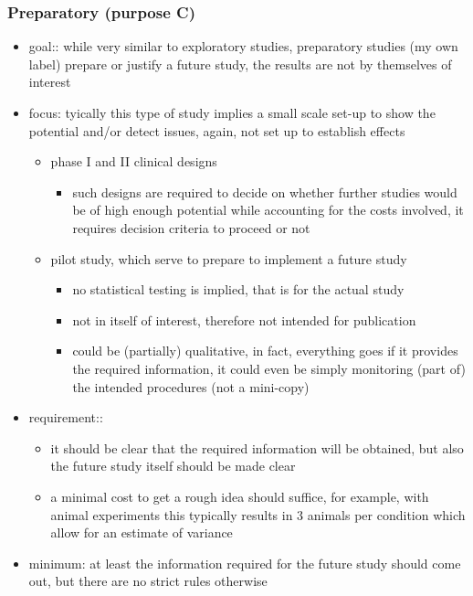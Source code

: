 \documentclass[]{article}
\providecommand{\tightlist}{%
  \setlength{\itemsep}{0pt}\setlength{\parskip}{0pt}}
\begin{document}
\subsubsection{Preparatory (purpose C)}\label{preparatory-purpose-c}

\begin{itemize}
\tightlist
\item
  goal:: while very similar to exploratory studies, preparatory studies
  (my own label) prepare or justify a future study, the results are not
  by themselves of interest
\item
  focus: tyically this type of study implies a small scale set-up to
  show the potential and/or detect issues, again, not set up to
  establish effects

  \begin{itemize}
  \tightlist
  \item
    phase I and II clinical designs

    \begin{itemize}
    \tightlist
    \item
      such designs are required to decide on whether further studies
      would be of high enough potential while accounting for the costs
      involved, it requires decision criteria to proceed or not
    \end{itemize}
  \item
    pilot study, which serve to prepare to implement a future study

    \begin{itemize}
    \tightlist
    \item
      no statistical testing is implied, that is for the actual study
    \item
      not in itself of interest, therefore not intended for publication
    \item
      could be (partially) qualitative, in fact, everything goes if it
      provides the required information, it could even be simply
      monitoring (part of) the intended procedures (not a mini-copy)
    \end{itemize}
  \end{itemize}
\item
  requirement::

  \begin{itemize}
  \tightlist
  \item
    it should be clear that the required information will be obtained,
    but also the future study itself should be made clear
  \item
    a minimal cost to get a rough idea should suffice, for example, with
    animal experiments this typically results in 3 animals per condition
    which allow for an estimate of variance
  \end{itemize}
\item
  minimum: at least the information required for the future study should
  come out, but there are no strict rules otherwise
\end{itemize}
\end{document}

